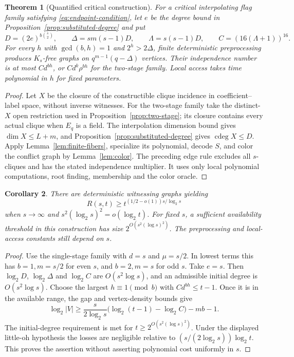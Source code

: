 \documentclass[11pt,a4paper]{article}
\DeclareMathOperator{\cdeg}{cdeg}
\newtheorem{theorem}{Theorem}[section]
\newtheorem{corollary}[theorem]{Corollary}
\theoremstyle{definition}
\theoremstyle{remark}
\numberwithin{equation}{section}
\begin{document}
\begin{theorem}[Quantified critical construction]\label{thm:quantified}
For a critical interpolating flag family satisfying \eqref{eq:endpoint-condition}, let $e$ be the degree bound in Proposition~\ref{prop:substituted-degree} and put
\begin{equation}\label{eq:quantitative-constants}
D=(2e)^{b\binom s2},\qquad
\Delta=s m(s-1)D,\qquad\Lambda=s(s-1)D,\qquad C=(16(\Lambda+1))^{16}.
\end{equation}
For every $h$ with $\gcd(b,h)=1$ and $2^h>2\Delta$, finite deterministic preprocessing produces $K_s$-free graphs on $q^{m-1}(q-\Delta)$ vertices. Their independence number is at most $C d^{bh}$, or $C d^k\rho^{bh}$ for the two-stage family. Local access takes time polynomial in $h$ for fixed parameters.
\end{theorem}

\begin{proof}
Let $X$ be the closure of the constructible clique incidence in coefficient--label space, without inverse witnesses. For the two-stage family take the distinct-$X$ open restriction used in Proposition~\ref{prop:two-stage}; its closure contains every actual clique when $E_q$ is a field. The interpolation dimension bound gives $\dim X\le L+m$, and Proposition~\ref{prop:substituted-degree} gives $\cdeg X\le D$. Apply Lemma~\ref{lem:finite-fibers}, specialize its polynomial, decode $S$, and color the conflict graph by Lemma~\ref{lem:color}. The preceding edge rule excludes all $s$-cliques and has the stated independence multiplier. It uses only local polynomial computations, root finding, membership and the color oracle.
\end{proof}

\begin{corollary}\label{cor:growing-range}
There are deterministic witnessing graphs yielding
\[
R(s,t)\ge t^{(1/2-o(1))s/\log_2s}
\]
when $s\to\infty$ and $s^2(\log_2s)^2=o(\log_2t)$. For fixed $s$, a sufficient availability threshold in this construction has size $2^{O(s^2(\log s)^2)}$. The preprocessing and local-access constants still depend on $s$.
\end{corollary}

\begin{proof}
Use the single-stage family with $d=s$ and $\mu=s/2$. In lowest terms this has $b=1,m=s/2$ for even $s$, and $b=2,m=s$ for odd $s$. Take $e=s$. Then $\log_2D$, $\log_2\Delta$ and $\log_2C$ are $O(s^2\log s)$, and an admissible initial degree is $O(s^2\log s)$. Choose the largest $h\equiv1\pmod b$ with $Cd^{bh}\le t-1$. Once it is in the available range, the gap and vertex-density bounds give
\[
\log_2|V|\ge\frac{s}{2\log_2s}\bigl(\log_2(t-1)-\log_2C\bigr)-mb-1.
\]
The initial-degree requirement is met for $t\ge2^{O(s^2(\log s)^2)}$. Under the displayed little-oh hypothesis the losses are negligible relative to $(s/(2\log_2s))\log_2t$. This proves the assertion without asserting polynomial cost uniformly in $s$.
\end{proof}
\end{document}
